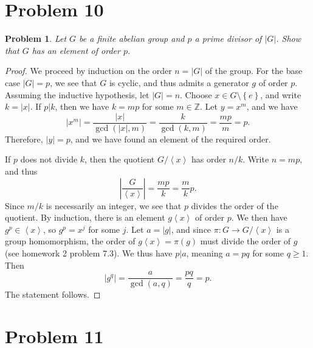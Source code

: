 \documentclass[11pt, letterpaper]{article}
\theoremstyle{plain}
\newtheorem{problem}{Problem}[section]
\begin{document}
\section{Problem 10}

\begin{problem}
	Let $G$ be a finite abelian group and $p$ a prime divisor of $\left| G \right| $. Show that $G$ has an element of order $p$.
\end{problem}
\begin{proof}
	We proceed by induction on the order $n=\left| G \right| $ of the group. For the base case $\left| G \right| =p$, we see that $G$ is cyclic, and thus admits a generator $g$ of order $p$. Assuming the inductive hypothesis, let $\left| G \right| =n$. Choose $x\in G\setminus \left\{ e \right\} $, and write $k=\left| x \right| $. If $p|k$, then we have $k=mp$ for some $m\in\mathbb{Z} $. Let $y=x^m$, and we have
	\[
		\left| x^m \right| =\frac{\left| x \right| }{\operatorname{gcd} (\left| x \right| ,m)} =\frac{k}{\operatorname{gcd} (k,m)} =\frac{mp}{m} =p
	.\]
	Therefore, $\left| y \right| =p$, and we have found an element of the required order.

	If $p$ does not divide $k$, then the quotient $G/\left\langle x \right\rangle $ has order $n/k$. Write $n=mp$, and thus
	\[
		\left| \frac{G}{\left\langle x \right\rangle }  \right| =\frac{mp}{k} =\frac{m}{k} p
	.\]
	Since $m/k$ is necessarily an integer, we see that $p$ divides the order of the quotient. By induction, there is an element $g\left\langle x \right\rangle $ of order $p$. We then have $g^p\in \left\langle x \right\rangle $, so $g^p=x^j$ for some $j$. Let $a=\left| g \right| $, and since $\pi : G \to G /\left\langle x \right\rangle $ is a group homomorphism, the order of $g \left\langle x \right\rangle =\pi (g)$ must divide the order of $g$ (see homework 2 problem 7.3). We thus have $p|a$, meaning $a=pq$ for some $q\geq 1$. Then
	\[
		\left| g^q \right| =\frac{a}{\operatorname{gcd} (a,q)} =\frac{pq}{q} =p
	.\]
	The statement follows.
\end{proof}

\section{Problem 11}
\end{document}
